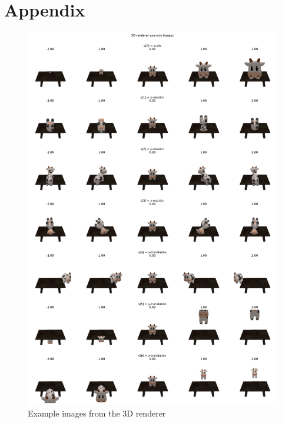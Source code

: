 \chapter{Appendix}

\begin{figure}[H]
    \centering
    \includegraphics[width=1.0\textwidth]{figures/3_3-example-images.pdf}
    \caption{Example images from the 3D renderer}
    \label{fig:3_3-example-images}
\end{figure}